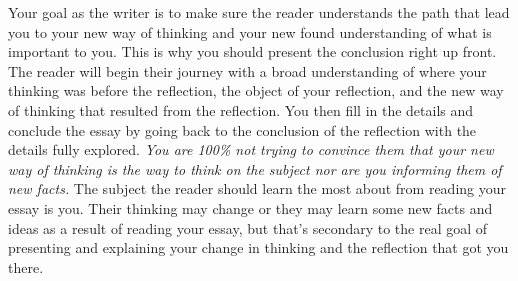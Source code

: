 \documentclass[nobib]{tufte-handout}
\begin{document}
Your goal as the writer is to make sure the reader understands the path that lead you to your new way of thinking and your new found understanding of what is important to you. This is why you should present the conclusion right up front. The reader will begin their journey with a broad understanding of  where your thinking was before the reflection, the object of your reflection, and the new way of thinking that resulted from the reflection. You then fill in the details and conclude the essay by going back to the conclusion of the reflection with the details fully explored. \textit{You are 100\% not trying to convince them that your new way of thinking is \textit{the} way to think on the subject nor are you informing them of new facts.} The subject the reader should learn the most about from reading your essay is you. Their thinking may change or they may learn some new facts and ideas as a result of reading your essay, but that's secondary to the real goal of presenting and explaining your change in thinking and the reflection that got you there.  
\end{document}
